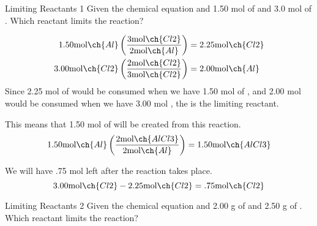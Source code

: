\begin{example}[]{Limiting Reactants 1}
  Given the chemical equation  and 1.50 \si{\mole} of  and 3.0 \si{\mole} of .
  Which reactant limits the reaction?

  \tcblower
  
  \begin{align*}
    1.50 \si{\mole} \ch{Al} \left( \frac{3 \si{\mole} \ch{Cl2}}{2 \si{\mole} \ch{Al}} \right) &= 2.25 \si{\mole} \ch{Cl2} \\
    3.00 \si{\mole} \ch{Cl2} \left( \frac{2 \si{\mole} \ch{Cl2}}{3 \si{\mole} \ch{Cl2}} \right) &= 2.00 \si{\mole} \ch{Al}
  \end{align*}
  Since 2.25 \si{\mole} of  would be consumed when we have 1.50 \si{\mole} of , and 2.00 \si{\mole}  would be consumed when we have 3.00 \si{\mole} , the  is the limiting reactant.

  This means that 1.50 \si{\mole} of  will be created from this reaction.
  \begin{equation*}
    1.50 \si{\mole} \ch{Al} \left( \frac{2 \si{\mole} \ch{AlCl3}}{2 \si{\mole} \ch{Al}} \right) = 1.50 \si{\mole} \ch{AlCl3}
  \end{equation*}

  We will have .75 \si{\mole}  left after the reaction takes place.
  \begin{equation*}
    3.00 \si{\mole} \ch{Cl2} - 2.25 \si{\mole} \ch{Cl2} = .75 \si{\mole} \ch{Cl2}
  \end{equation*}
\end{example}

\begin{example}[]{Limiting Reactants 2}
  Given the chemical equation  and 2.00 \si{\gram} of  and 2.50 \si{\gram} of .
  Which reactant limits the reaction?

  \tcblower
\end{example}
